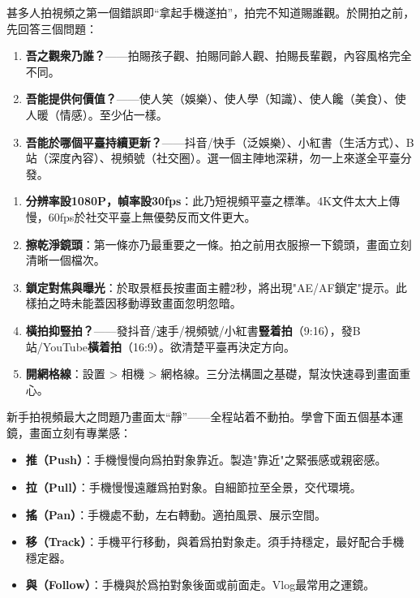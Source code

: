 


甚多人拍視頻之第一個錯誤即“拿起手機遂拍”，拍完不知道賜誰觀。於開拍之前，先回答三個問題：

\begin{enumerate}
  \item \textbf{吾之觀衆乃誰？}——拍賜孩子觀、拍賜同齡人觀、拍賜長輩觀，內容風格完全不同。
  \item \textbf{吾能提供何價值？}——使人笑（娛樂）、使人學（知識）、使人饞（美食）、使人暖（情感）。至少佔一樣。
  \item \textbf{吾能於哪個平臺持續更新？}——抖音/快手（泛娛樂）、小紅書（生活方式）、B站（深度內容）、視頻號（社交圈）。選一個主陣地深耕，勿一上來遂全平臺分發。
\end{enumerate}


\begin{enumerate}
  \item \textbf{分辨率設1080P，幀率設30fps}：此乃短視頻平臺之標準。4K文件太大上傳慢，60fps於社交平臺上無優勢反而文件更大。
  \item \textbf{擦乾淨鏡頭}：第一條亦乃最重要之一條。拍之前用衣服擦一下鏡頭，畫面立刻清晰一個檔次。
  \item \textbf{鎖定對焦與曝光}：於取景框長按畫面主體2秒，將出現"AE/AF鎖定"提示。此樣拍之時未能蓋因移動導致畫面忽明忽暗。
  \item \textbf{橫拍抑豎拍？}——發抖音/速手/視頻號/小紅書\textbf{豎着拍}（9:16），發B站/YouTube\textbf{橫着拍}（16:9）。欲清楚平臺再決定方向。
  \item \textbf{開網格線}：設置 > 相機 > 網格線。三分法構圖之基礎，幫汝快速尋到畫面重心。
\end{enumerate}


新手拍視頻最大之問題乃畫面太“靜”——全程站着不動拍。學會下面五個基本運鏡，畫面立刻有專業感：

\begin{itemize}
  \item \textbf{推（Push）}：手機慢慢向爲拍對象靠近。製造"靠近"之緊張感或親密感。
  \item \textbf{拉（Pull）}：手機慢慢遠離爲拍對象。自細節拉至全景，交代環境。
  \item \textbf{搖（Pan）}：手機處不動，左右轉動。適拍風景、展示空間。
  \item \textbf{移（Track）}：手機平行移動，與着爲拍對象走。須手持穩定，最好配合手機穩定器。
  \item \textbf{與（Follow）}：手機與於爲拍對象後面或前面走。Vlog最常用之運鏡。
\end{itemize}


